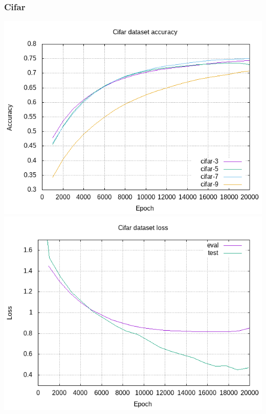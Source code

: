 \documentclass{beamer}
\begin{document}
\begin{frame}
\frametitle{Cifar}
\begin{center}
	\includegraphics[height=0.45\textheight]{cifar-accuracy}
	\includegraphics[height=0.45\textheight]{cifar-loss}
\end{center}
\end{frame}
\end{document}
